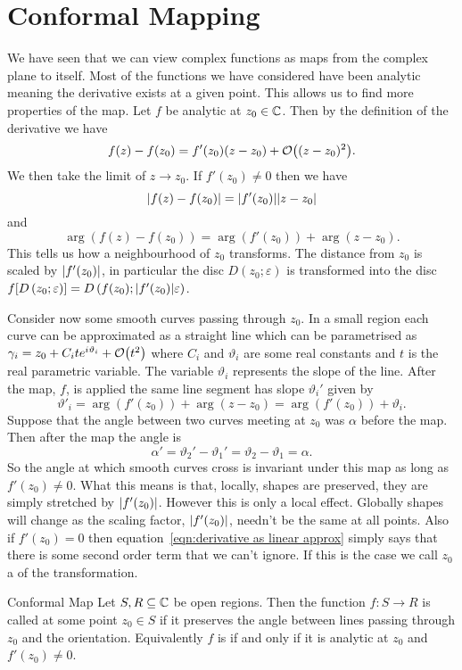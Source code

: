 \documentclass{article}
\newcommand{\discOpen}[2]{D\left({#1}; {#2}\right)}
\begin{document}
    \section{Conformal Mapping}
    We have seen that we can view complex functions as maps from the complex plane to itself.
    Most of the functions we have considered have been analytic meaning the derivative exists at a given point.
    This allows us to find more properties of the map.
    Let \(f\) be analytic at \(z_0 \in\mathbb{C}\).
    Then by the definition of the derivative we have
    \begin{equation}\label{eqn:derivative as linear approx}
        f(z) - f(z_0) = f'(z_0)(z - z_0) + \order{(z - z_0)^2}.
    \end{equation}
    We then take the limit of \(z \to z_0\).
    If \(f'(z_0) \ne 0\) then we have
    \[\abs{f(z) - f(z_0)} = \abs{f'(z_0)}\abs{z - z_0}\]
    and
    \[\arg(f(z) - f(z_0)) = \arg(f'(z_0)) + \arg(z - z_0).\]
    This tells us how a neighbourhood of \(z_0\) transforms.
    The distance from \(z_0\) is scaled by \(\abs{f'(z_0)}\), in particular the disc \(\discOpen{z_0}{\varepsilon}\) is transformed into the disc \(f[\discOpen{z_0}{\varepsilon}] = \discOpen{f(z_0)}{\abs{f'(z_0)}\varepsilon}\).
    
    Consider now some smooth curves passing through \(z_0\).
    In a small region each curve can be approximated as a straight line which can be parametrised as \(\gamma_i = z_0 + C_ite^{i\vartheta_i} + \order{t^2}\) where \(C_i\) and \(\vartheta_i\) are some real constants and \(t\) is the real parametric variable.
    The variable \(\vartheta_i\) represents the slope of the line.
    After the map, \(f\), is applied the same line segment has slope \(\vartheta_i'\) given by
    \[\vartheta'_i = \arg(f'(z_0)) + \arg(z - z_0) = \arg(f'(z_0)) + \vartheta_i.\]
    Suppose that the angle between two curves meeting at \(z_0\) was \(\alpha\) before the map.
    Then after the map the angle is
    \[\alpha' = \vartheta_2' - \vartheta_1' = \vartheta_2 - \vartheta_1 = \alpha.\]
    So the angle at which smooth curves cross is invariant under this map as long as \(f'(z_0) \ne 0\).
    What this means is that, locally, shapes are preserved, they are simply stretched by \(\abs{f'(z_0)}\).
    However this is only a local effect.
    Globally shapes will change as the scaling factor, \(\abs{f'(z_0)}\), needn't be the same at all points.
    Also if \(f'(z_0) = 0\) then equation~\ref{eqn:derivative as linear approx} simply says that there is some second order term that we can't ignore.
    If this is the case we call \(z_0\) a  of the transformation.
    \begin{definition}{Conformal Map}{}
        Let \(S, R\subseteq\mathbb{C}\) be open regions.
        Then the function \(f\colon S \to R\) is called  at some point \(z_0\in S\) if it preserves the angle between lines passing through \(z_0\) and the orientation.
        Equivalently \(f\) is  if and only if it is analytic at \(z_0\) and \(f'(z_0) \ne 0\).
    \end{definition}
    
\end{document}
